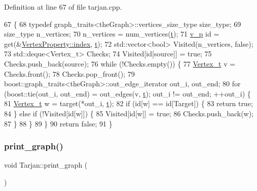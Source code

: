 Definition at line 67 of file tarjan.\+cpp.


\begin{DoxyCode}
67                                                            \{
68     \textcolor{keyword}{typedef} graph\_traits<theGraph>::vertices\_size\_type size\_type;
69     size\_type n\_vertices;
70     n\_vertices = num\_vertices(\hyperlink{class_tarjan_a54b0703f885a3514ea0bf4cdbc7fdaad}{t});
71     \hyperlink{utilities_8h_a3f4959b3d837fa6351a9414c79280286}{v\_p} \textcolor{keywordtype}{id} = \textcolor{keyword}{get}(&\hyperlink{struct_utility_structs_1_1_vertex_property_a636cb729438e999aa3d9a17ac39d8641}{VertexProperty::index}, \hyperlink{class_tarjan_a54b0703f885a3514ea0bf4cdbc7fdaad}{t});
72     std::vector<bool> Visited(n\_vertices, \textcolor{keyword}{false});
73     std::deque<Vertex\_t> Checks;
74     Visited[\textcolor{keywordtype}{id}[source]] = \textcolor{keyword}{true};
75     Checks.push\_back(source);
76     \textcolor{keywordflow}{while} (!Checks.empty()) \{
77         \hyperlink{utilities_8h_a344cd987714d06997f0becda3c96d6e2}{Vertex\_t} v = Checks.front();
78         Checks.pop\_front();
79         boost::graph\_traits<theGraph>::out\_edge\_iterator out\_i, out\_end;
80         \textcolor{keywordflow}{for} (boost::tie(out\_i, out\_end) = out\_edges(v, \hyperlink{class_tarjan_a54b0703f885a3514ea0bf4cdbc7fdaad}{t}); out\_i != out\_end; ++out\_i) \{
81             \hyperlink{utilities_8h_a344cd987714d06997f0becda3c96d6e2}{Vertex\_t} w = target(*out\_i, \hyperlink{class_tarjan_a54b0703f885a3514ea0bf4cdbc7fdaad}{t});
82             \textcolor{keywordflow}{if} (\textcolor{keywordtype}{id}[w] == \textcolor{keywordtype}{id}[Target]) \{
83                 \textcolor{keywordflow}{return} \textcolor{keyword}{true};
84             \} \textcolor{keywordflow}{else} \textcolor{keywordflow}{if} (!Visited[\textcolor{keywordtype}{id}[w]]) \{
85                 Visited[\textcolor{keywordtype}{id}[w]] = \textcolor{keyword}{true};
86                 Checks.push\_back(w);
87             \}
88         \}
89     \}
90     \textcolor{keywordflow}{return} \textcolor{keyword}{false};
91 \}
\end{DoxyCode}
\mbox{\label{class_tarjan_a0ef20e22407703c87c880898c8ad5745}} 
\subsubsection{\texorpdfstring{print\+\_\+graph()}{print\_graph()}}
{\footnotesize\ttfamily void Tarjan\+::print\+\_\+graph (\begin{DoxyParamCaption}{ }\end{DoxyParamCaption})}



